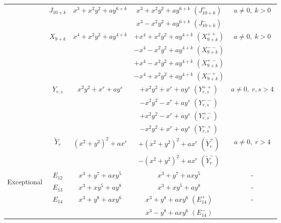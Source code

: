 \documentclass[noend]{amsproc}
\theoremstyle{definition}
\newcommand{\tY}{\widetilde{Y}}
\begin{document}
\begin{table}[htbp]
\begin{tabular}{|c|c|c|c|c|}
& \multirow{2}{*}{$J_{10+k}$} & \multirow{2}{*}{$x^3+x^2y^2+ay^{6+k}$}
  & $x^3+x^2y^2+ay^{6+k}$ $(J_{10+k}^+)$
      & \multirow{2}{*}{$a \neq 0,\; k > 0$} \\ \cline{4-4}
&&& $x^3-x^2y^2+ay^{6+k}$ $(J_{10+k}^-)$ &   \\ \cline{2-5}

& \multirow{4}{*}{$X_{9+k}$} & \multirow{4}{*}{$x^4+x^2y^2+ay^{4+k}$}
  & $+x^4+x^2y^2+ay^{4+k}$ $(X_{9+k}^{++})$
      & \multirow{4}{*}{$a \neq 0,\; k > 0$}  \\ \cline{4-4}
&&& $-x^4-x^2y^2+ay^{4+k}$ $(X_{9+k}^{--})$ & \\ \cline{4-4}
&&& $+x^4-x^2y^2+ay^{4+k}$ $(X_{9+k}^{+-})$ & \\ \cline{4-4}
&&& $-x^4+x^2y^2+ay^{4+k}$ $(X_{9+k}^{-+})$ & \\ \cline{2-5}

& \multirow{4}{*}{$Y_{r,s}$} & \multirow{4}{*}{$x^2y^2+x^r+ay^s$}
  & $+x^2y^2+x^r+ay^s$ $(Y_{r,s}^{++})$
      & \multirow{4}{*}{$a \neq 0,\; r,s > 4$} \\ \cline{4-4}
&&& $-x^2y^2-x^r+ay^s$ $(Y_{r,s}^{--})$ &      \\ \cline{4-4}
&&& $+x^2y^2-x^r+ay^s$ $(Y_{r,s}^{+-})$ &      \\ \cline{4-4}
&&& $-x^2y^2+x^r+ay^s$ $(Y_{r,s}^{-+})$ &      \\ \cline{2-5}

& \multirow{2}{*}{$\tY_r$} & \multirow{2}{*}{$(x^2+y^2)^2+ax^r$}
  & $+(x^2+y^2)^2+ax^r$ $(\tY_r^+)$
      & \multirow{2}{*}{$a \neq 0,\; r > 4$} \\ \cline{4-4}
&&& $-(x^2+y^2)^2+ax^r$ $(\tY_r^-)$ &        \\ \hline


\multirow{12}{*}{\begin{sideways}Exceptional\end{sideways}}

& $E_{12}$ & $x^3+y^7+axy^5$ & $x^3+y^7+axy^5$ & - \\ \cline{2-5}

& $E_{13}$ & $x^3+xy^5+ay^8$ & $x^3+xy^5+ay^8$ & - \\ \cline{2-5}

& \multirow{2}{*}{$E_{14}$} & \multirow{2}{*}{$x^3+y^8+axy^6$}
  & $x^3+y^8+axy^6$ $(E_{14}^+)$ & \multirow{2}{*}{-} \\ \cline{4-4}
&&& $x^3-y^8+axy^6$ $(E_{14}^-)$ &                    \\ \cline{2-5}


\end{tabular}
\end{table}
\end{document}
